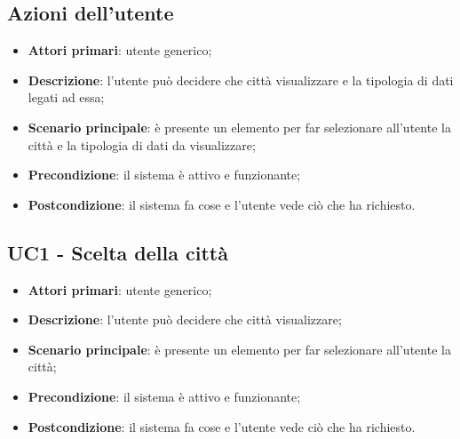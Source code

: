 \subsection{Azioni dell'utente}
\begin{itemize}
	\item \textbf{Attori primari}: utente generico;
	\item \textbf{Descrizione}: l'utente può decidere che città visualizzare e la tipologia di dati legati ad essa;
	\item \textbf{Scenario principale}: è presente un elemento per far selezionare all'utente la città e la tipologia di dati da visualizzare;
	\item \textbf{Precondizione}: il sistema è attivo e funzionante;
	\item \textbf{Postcondizione}: il sistema fa cose e l'utente vede ciò che ha richiesto.
\end{itemize}

\subsection{UC1 - Scelta della città}
\begin{itemize}
\item \textbf{Attori primari}: utente generico;
\item \textbf{Descrizione}: l'utente può decidere che città visualizzare;
\item \textbf{Scenario principale}: è presente un elemento per far selezionare all'utente la città;
\item \textbf{Precondizione}: il sistema è attivo e funzionante;
\item \textbf{Postcondizione}: il sistema fa cose e l'utente vede ciò che ha richiesto.
\end{itemize}

